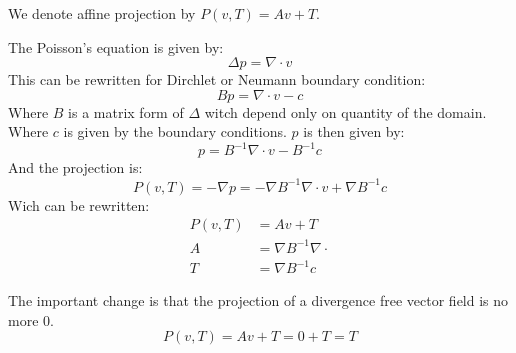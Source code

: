   \begin{definition}
  We denote affine projection by $P(v,T)=Av+T$.
  
  The Poisson's equation is given by:
  \begin{equation}
   \Delta p=\nabla \cdot v
  \end{equation}
This can be rewritten for Dirchlet or Neumann boundary condition:
\begin{equation}
 B p=\nabla \cdot v-c
\end{equation}
Where $B$ is a matrix form of $\Delta$ witch depend only on quantity of the domain.
Where $c$ is given by the boundary conditions.
$p$ is then given by:
\begin{equation}
 p=B^{-1} \nabla \cdot v-B^{-1}c
\end{equation}
And the projection is:
\begin{equation}
 P(v,T)=-\nabla p=-\nabla B^{-1}\nabla \cdot v+\nabla B^{-1}c
\end{equation}
Wich can be rewritten:
\begin{align}
P(v,T)&=Av+T\\
A&=\nabla B^{-1}\nabla \cdot\\
T&=\nabla B^{-1}c
\end{align}
  
  \end{definition}
  
  The important change is that the projection of a divergence free vector field is no more 0.
  \begin{equation}
  P(v,T)=Av+T=0+T=T
  \end{equation}




